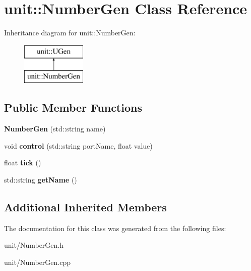 \hypertarget{classunit_1_1NumberGen}{}\section{unit\+:\+:Number\+Gen Class Reference}
\label{classunit_1_1NumberGen}
Inheritance diagram for unit\+:\+:Number\+Gen\+:\begin{figure}[H]
\begin{center}
\leavevmode
\includegraphics[height=2.000000cm]{classunit_1_1NumberGen}
\end{center}
\end{figure}
\subsection*{Public Member Functions}
\begin{DoxyCompactItemize}
\item 
{\bfseries Number\+Gen} (std\+::string name)\hypertarget{classunit_1_1NumberGen_a6e93812c4805a43f19f8fb11680e32a4}{}\label{classunit_1_1NumberGen_a6e93812c4805a43f19f8fb11680e32a4}

\item 
void {\bfseries control} (std\+::string port\+Name, float value)\hypertarget{classunit_1_1NumberGen_a9daaaf8a12389873494bb1ad2f877c8c}{}\label{classunit_1_1NumberGen_a9daaaf8a12389873494bb1ad2f877c8c}

\item 
float {\bfseries tick} ()\hypertarget{classunit_1_1NumberGen_a38cef7d64a12e40bf2ae14f29def41ca}{}\label{classunit_1_1NumberGen_a38cef7d64a12e40bf2ae14f29def41ca}

\item 
std\+::string {\bfseries get\+Name} ()\hypertarget{classunit_1_1NumberGen_aad98cf527ae6ffe5493d124a68824e06}{}\label{classunit_1_1NumberGen_aad98cf527ae6ffe5493d124a68824e06}

\end{DoxyCompactItemize}
\subsection*{Additional Inherited Members}


The documentation for this class was generated from the following files\+:\begin{DoxyCompactItemize}
\item 
unit/Number\+Gen.\+h\item 
unit/Number\+Gen.\+cpp\end{DoxyCompactItemize}

